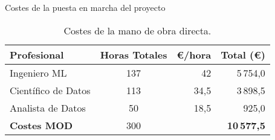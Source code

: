 \begin{frame}{Costes de la puesta en marcha del proyecto}

\begin{table}[H]
\centering
\begin{tabular}{|l|c|r|r|}
\toprule
\textbf{Profesional} & \textbf{Horas Totales} & \textbf{€/hora} & \textbf{Total (€)} \\
\midrule
Ingeniero ML & 137 & 42 & 5\,754,0 \\
Científico de Datos & 113 & 34,5 & 3\,898,5 \\
Analista de Datos & 50 & 18,5 & 925,0 \\
\midrule
\textbf{Costes MOD} & 300 & & \textbf{10\,577,5} \\
\bottomrule
\end{tabular}
\caption{Costes de la mano de obra directa.}
\label{tab:costes_totales}
\end{table}

\end{frame}
